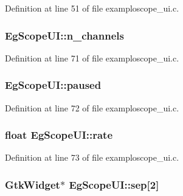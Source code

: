 Definition at line 51 of file examploscope\+\_\+ui.\+c.

\subsubsection[{\texorpdfstring{n\+\_\+channels}{n_channels}}]{ Eg\+Scope\+U\+I\+::n\+\_\+channels}\hypertarget{struct_eg_scope_u_i_a85e0b481e8221476d499520df18ef3fb}{}\label{struct_eg_scope_u_i_a85e0b481e8221476d499520df18ef3fb}


Definition at line 71 of file examploscope\+\_\+ui.\+c.

\subsubsection[{\texorpdfstring{paused}{paused}}]{ Eg\+Scope\+U\+I\+::paused}\hypertarget{struct_eg_scope_u_i_a4beda886d8ce3c72037fcfae5d6d13fc}{}\label{struct_eg_scope_u_i_a4beda886d8ce3c72037fcfae5d6d13fc}


Definition at line 72 of file examploscope\+\_\+ui.\+c.

\subsubsection[{\texorpdfstring{rate}{rate}}]{\setlength{\rightskip}{0pt plus 5cm}float Eg\+Scope\+U\+I\+::rate}\hypertarget{struct_eg_scope_u_i_a0420ce71a5020b536cfb74e375f4d57c}{}\label{struct_eg_scope_u_i_a0420ce71a5020b536cfb74e375f4d57c}


Definition at line 73 of file examploscope\+\_\+ui.\+c.

\subsubsection[{\texorpdfstring{sep}{sep}}]{\setlength{\rightskip}{0pt plus 5cm}Gtk\+Widget$\ast$ Eg\+Scope\+U\+I\+::sep\mbox{[}2\mbox{]}}\hypertarget{struct_eg_scope_u_i_a4cd6d5cbbd16186c2ce8a90d8aed5e13}{}\label{struct_eg_scope_u_i_a4cd6d5cbbd16186c2ce8a90d8aed5e13}


